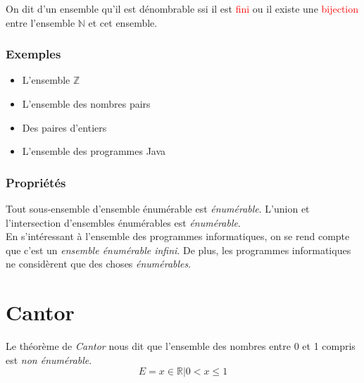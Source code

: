 \documentclass{report}
\begin{document}
On dit d'un ensemble qu'il est dénombrable ssi il est \textcolor{red}{fini} ou il existe une \textcolor{red}{bijection} entre l'ensemble $\mathbb{N}$ et cet ensemble.

\subsubsection{Exemples}
\begin{itemize}
\item L'ensemble $\mathbb{Z}$
\item L'ensemble des nombres pairs
\item Des paires d'entiers
\item L'ensemble des programmes Java
\end{itemize}

\subsubsection{Propriétés}
Tout sous-ensemble d'ensemble énumérable est \textit{énumérable}. L'union et l'intersection d'ensembles énumérables est \textit{énumérable}.\\

En s'intéressant à l'ensemble des programmes informatiques, on se rend compte que c'est un \textit{ensemble énumérable infini}. De plus, les programmes informatiques ne considèrent que des choses \textit{énumérables}.

\section{Cantor}
Le théorème de \textit{Cantor} nous dit que l'ensemble des nombres entre 0 et 1 compris est \textit{non énumérable}.
\begin{equation}
E = {x \in \mathbb{R} | 0 < x \le 1}
\end{equation}
\end{document}
